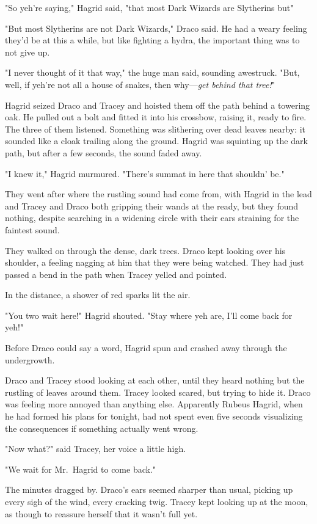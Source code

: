 "So yeh're saying," Hagrid said, "that most Dark Wizards are Slytherins{\el}
but{\el}"

"But most Slytherins are not Dark Wizards," Draco said. He had a weary feeling
they'd be at this a while, but like fighting a hydra, the important thing was
to not give up.

"I never thought of it that way," the huge man said, sounding awestruck. "But,
well, if yeh're not all a house of snakes, then why---\emph{get behind that
tree!}"

Hagrid seized Draco and Tracey and hoisted them off the path behind a towering
oak. He pulled out a bolt and fitted it into his crossbow, raising it, ready to
fire. The three of them listened. Something was slithering over dead leaves
nearby: it sounded like a cloak trailing along the ground. Hagrid was squinting
up the dark path, but after a few seconds, the sound faded away.

"I knew it," Hagrid murmured. "There's summat in here that shouldn' be."

They went after where the rustling sound had come from, with Hagrid in the lead
and Tracey and Draco both gripping their wands at the ready, but they found
nothing, despite searching in a widening circle with their ears straining for
the faintest sound.

They walked on through the dense, dark trees. Draco kept looking over his
shoulder, a feeling nagging at him that they were being watched. They had just
passed a bend in the path when Tracey yelled and pointed.

In the distance, a shower of red sparks lit the air.

"You two wait here!" Hagrid shouted. "Stay where yeh are, I'll come back for
yeh!"

Before Draco could say a word, Hagrid spun and crashed away through the
undergrowth.

Draco and Tracey stood looking at each other, until they heard nothing but the
rustling of leaves around them. Tracey looked scared, but trying to hide it.
Draco was feeling more annoyed than anything else. Apparently Rubeus Hagrid,
when he had formed his plans for tonight, had not spent even five seconds
visualizing the consequences if something actually went wrong.

"Now what?" said Tracey, her voice a little high.

"We wait for Mr.~Hagrid to come back."

The minutes dragged by. Draco's ears seemed sharper than usual, picking up
every sigh of the wind, every cracking twig. Tracey kept looking up at the
moon, as though to reassure herself that it wasn't full yet.

